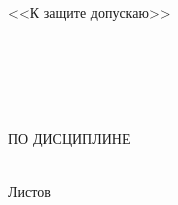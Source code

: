\begin{ESKDtitlePage}
    \begin{center}
        \gpiMinEdu \\
        \gpiEdu \\
        \gpiKaf \\
    \end{center}

    \vfill

    \begin{flushright}
        \begin{minipage}[t]{.45\textwidth}
            <<К защите допускаю>> \\
            \gpiHeadDepartmentInfo \\
            \underline{\hspace{3cm}} \gpiHeadDepartmentName~\gpiHeadDepartmentSurname \\
            \PageTitleDateField
        \end{minipage}
    \end{flushright}

    \vfill

    \begin{center}
        \gpiTopic \\
    \end{center}

    \vfill

    \begin{center}
        \textbf{\gpiDocTopic} \\
        ПО ДИСЦИПЛИНЕ \gpiDiscipline \\
    \end{center}

    \vfill

    \begin{center}
        \gpiCode \\
        Листов \pageref{LastPage} \\
    \end{center}

    \vfill

    

    \vfill

    \begin{center}
        \ESKDtheYear
    \end{center}
\end{ESKDtitlePage}
